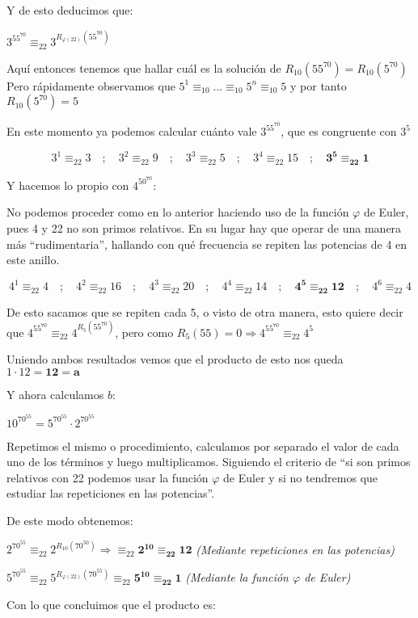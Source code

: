 \documentclass[11pt, a4paper, titlepage]{article}
\begin{document}
Y de esto deducimos que:

$3^{55^{70}} \equiv_{22} 3^{R_{\varphi(22)}(55^{70})}$

Aquí entonces tenemos que hallar cuál es la solución de $R_{10}(55^{70}) = R_{10}(5^{70})$
Pero rápidamente observamos que $5^1\equiv_{10}...\equiv_{10}5^n\equiv_{10}5$
 y por tanto $R_{10}(5^{70}) = 5$
 
En este momento ya podemos calcular cuánto vale $3^{55^{70}}$, que es congruente con $3^5$

$$3^1\equiv_{22}3\quad;\quad3^2\equiv_{22}9\quad;\quad3^3\equiv_{22}5\quad;\quad3^4\equiv_{22}15\quad;\quad \mathbf{3^5\equiv_{22}1}$$

Y hacemos lo propio con $4^{50^{70}}$:

No podemos proceder como en lo anterior haciendo uso de la función $\varphi$ de Euler, pues 4 y 22 no son primos relativos. En su lugar hay que operar de una manera más “rudimentaria”, hallando con qué frecuencia se repiten las potencias de 4 en este anillo.

$$4^1\equiv_{22}4\quad;\quad 4^2\equiv_{22}16\quad;\quad 4^3\equiv_{22}20\quad;\quad 4^4\equiv_{22}14\quad;\quad\mathbf{4^5\equiv_{22}12}\quad;\quad 4^6\equiv_{22}4$$

De esto sacamos que se repiten cada 5, o visto de otra manera, esto quiere decir que $4^{55^{70}}\equiv_{22} 4^{R_5(55^{70})} $, pero como $R_5(55) = 0 \Rightarrow 4^{55^{70}}\equiv_{22} 4^5$

Uniendo ambos resultados vemos que el producto de esto nos queda $1\cdot 12 = \mathbf{12 = a}$ 


Y ahora calculamos $b$:

$10^{70^{55}} = 5^{70^{55}} \cdot 2^{70^{55}}$

Repetimos el mismo o procedimiento, calculamos por separado el valor de cada uno de los términos y luego multiplicamos. Siguiendo el criterio de “si son primos relativos con 22 podemos usar la función $\varphi$ de Euler y si no tendremos que estudiar las repeticiones en las potencias”.

De este modo obtenemos:

$2^{70^{55}} \equiv_{22}2^{R_{10}(70^{50})} \Rightarrow \equiv_{22}\mathbf{2^{10}\equiv_{22}12}$ \emph{(Mediante repeticiones en las potencias)}

$5^{70^{55}}\equiv_{22}5^{R_{\varphi(22)}(70^{55})}\equiv_{22}\mathbf{5^{10}\equiv_{22}1}$ \emph{(Mediante la función $\varphi$ de Euler)}

Con lo que concluimos que el producto es:
\end{document}
